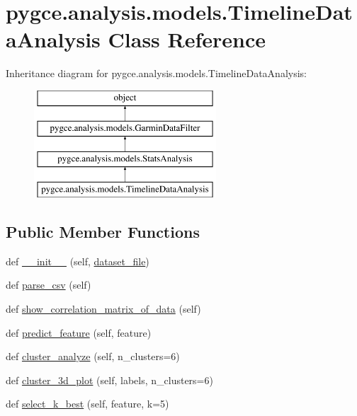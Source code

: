 \hypertarget{classpygce_1_1analysis_1_1models_1_1_timeline_data_analysis}{}\section{pygce.\+analysis.\+models.\+Timeline\+Data\+Analysis Class Reference}
\label{classpygce_1_1analysis_1_1models_1_1_timeline_data_analysis}
Inheritance diagram for pygce.\+analysis.\+models.\+Timeline\+Data\+Analysis\+:\begin{figure}[H]
\begin{center}
\leavevmode
\includegraphics[height=4.000000cm]{classpygce_1_1analysis_1_1models_1_1_timeline_data_analysis}
\end{center}
\end{figure}
\subsection*{Public Member Functions}
\begin{DoxyCompactItemize}
\item 
def \hyperlink{classpygce_1_1analysis_1_1models_1_1_timeline_data_analysis_a7fccb7531cafe3b618ad7026db2d3b53}{\+\_\+\+\_\+init\+\_\+\+\_\+} (self, \hyperlink{classpygce_1_1analysis_1_1models_1_1_garmin_data_filter_a7bb7be05577c2d31546e27823a5d11c5}{dataset\+\_\+file})
\item 
def \hyperlink{classpygce_1_1analysis_1_1models_1_1_timeline_data_analysis_a1a02ca1184152091fc1f66306e1ac02c}{parse\+\_\+csv} (self)
\item 
def \hyperlink{classpygce_1_1analysis_1_1models_1_1_timeline_data_analysis_ac5f4540c89ea52ccbd5c28ce850bc1d3}{show\+\_\+correlation\+\_\+matrix\+\_\+of\+\_\+data} (self)
\item 
def \hyperlink{classpygce_1_1analysis_1_1models_1_1_timeline_data_analysis_ab769c6f075333081a68712e0ecf8b094}{predict\+\_\+feature} (self, feature)
\item 
def \hyperlink{classpygce_1_1analysis_1_1models_1_1_timeline_data_analysis_a4bdbc9b67a365b2e0d5a76e7bd811ce5}{cluster\+\_\+analyze} (self, n\+\_\+clusters=6)
\item 
def \hyperlink{classpygce_1_1analysis_1_1models_1_1_timeline_data_analysis_a981ac0211fd075b7fae599a09f385314}{cluster\+\_\+3d\+\_\+plot} (self, labels, n\+\_\+clusters=6)
\item 
def \hyperlink{classpygce_1_1analysis_1_1models_1_1_timeline_data_analysis_a2f8938bff9d88b45dbdc7342b84d1bc6}{select\+\_\+k\+\_\+best} (self, feature, k=5)
\end{DoxyCompactItemize}
